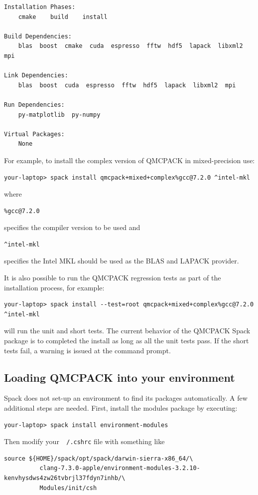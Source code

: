 \begin{verbatim}
Installation Phases:
    cmake    build    install

Build Dependencies:
    blas  boost  cmake  cuda  espresso  fftw  hdf5  lapack  libxml2  mpi

Link Dependencies:
    blas  boost  cuda  espresso  fftw  hdf5  lapack  libxml2  mpi

Run Dependencies:
    py-matplotlib  py-numpy

Virtual Packages:
    None
\end{verbatim}

For example, to install the complex version of QMCPACK in mixed-precision use:
\verbatimfont{\footnotesize}
\begin{verbatim}
your-laptop> spack install qmcpack+mixed+complex%gcc@7.2.0 ^intel-mkl
\end{verbatim}
where
\verbatimfont{\footnotesize}
\begin{verbatim}
%gcc@7.2.0
\end{verbatim}
specifies the compiler version to be used and
\verbatimfont{\footnotesize}
\begin{verbatim}
^intel-mkl
\end{verbatim}
specifies the Intel MKL should be used as the BLAS and LAPACK provider.

It is also possible to run the QMCPACK regression tests as part of the
installation process, for example:
\verbatimfont{\footnotesize}
\begin{verbatim}
your-laptop> spack install --test=root qmcpack+mixed+complex%gcc@7.2.0 ^intel-mkl
\end{verbatim}
will run the unit and short tests. The current behavior of the QMCPACK
Spack package is to completed the install as long as all the unit tests
pass. If the short tests fail, a warning is issued at the command prompt.

\subsection{Loading QMCPACK into your environment}
Spack does not set-up an environment to find its packages
automatically. A few additional steps are needed. First, install the
modules package by executing:
\verbatimfont{\footnotesize}
\begin{verbatim}
your-laptop> spack install environment-modules
\end{verbatim}

Then modify your\texttt{ ~/.cshrc} file with something like
\verbatimfont{\footnotesize}
\begin{verbatim}
source ${HOME}/spack/opt/spack/darwin-sierra-x86_64/\
          clang-7.3.0-apple/environment-modules-3.2.10-kenvhysdws4zw26tvbrjl37fdyn7inhb/\
          Modules/init/csh
\end{verbatim}

